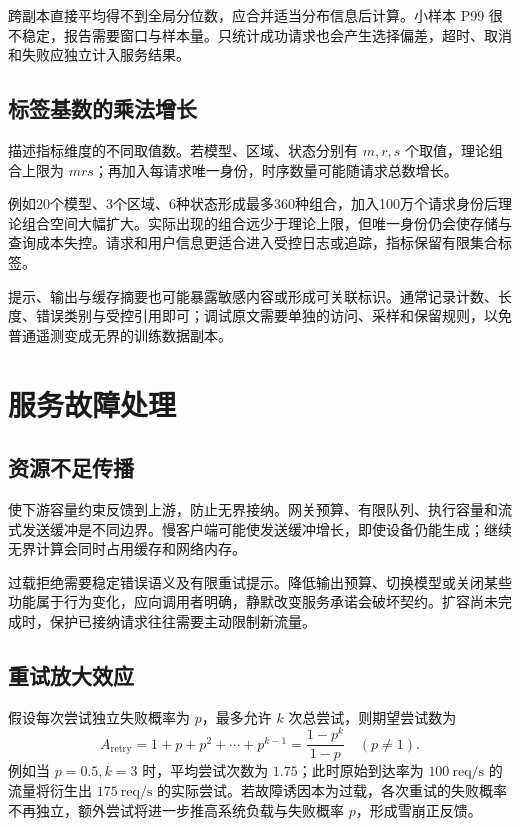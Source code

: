 \documentclass[../textbook.tex]{subfiles}
\begin{document}
跨副本直接平均得不到全局分位数，应合并适当分布信息后计算。小样本 P99 很不稳定，报告需要窗口与样本量。只统计成功请求也会产生选择偏差，超时、取消和失败应独立计入服务结果。

\subsection{标签基数的乘法增长}
描述指标维度的不同取值数。若模型、区域、状态分别有 $m,r,s$ 个取值，理论组合上限为 $mrs$；再加入每请求唯一身份，时序数量可能随请求总数增长。

例如20个模型、3个区域、6种状态形成最多360种组合，加入100万个请求身份后理论组合空间大幅扩大。实际出现的组合远少于理论上限，但唯一身份仍会使存储与查询成本失控。请求和用户信息更适合进入受控日志或追踪，指标保留有限集合标签。

提示、输出与缓存摘要也可能暴露敏感内容或形成可关联标识。通常记录计数、长度、错误类别与受控引用即可；调试原文需要单独的访问、采样和保留规则，以免普通遥测变成无界的训练数据副本。

\section{服务故障处理}

\subsection{资源不足传播}
使下游容量约束反馈到上游，防止无界接纳。网关预算、有限队列、执行容量和流式发送缓冲是不同边界。慢客户端可能使发送缓冲增长，即使设备仍能生成；继续无界计算会同时占用缓存和网络内存。

过载拒绝需要稳定错误语义及有限重试提示。降低输出预算、切换模型或关闭某些功能属于行为变化，应向调用者明确，静默改变服务承诺会破坏契约。扩容尚未完成时，保护已接纳请求往往需要主动限制新流量。

\subsection{重试放大效应}
假设每次尝试独立失败概率为 $p$，最多允许 $k$ 次总尝试，则期望尝试数为
\begin{equation}
 A_{\mathrm{retry}}=1+p+p^2+\cdots+p^{k-1}
 =\frac{1-p^k}{1-p}\quad(p\ne1).
 \label{eq:serving-retry}
\end{equation}
例如当 $p=0.5, k=3$ 时，平均尝试次数为 $1.75$；此时原始到达率为 $\qty{100}{\text{req}/\second}$ 的流量将衍生出 $\qty{175}{\text{req}/\second}$ 的实际尝试。若故障诱因本为过载，各次重试的失败概率不再独立，额外尝试将进一步推高系统负载与失败概率 $p$，形成雪崩正反馈。
\end{document}

